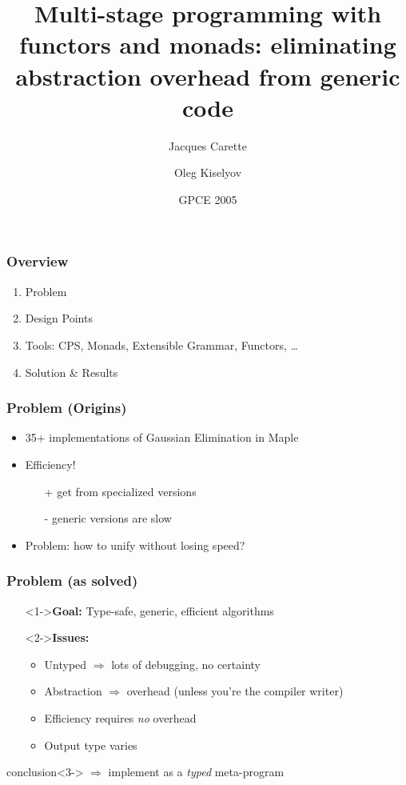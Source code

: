 \documentclass{beamer}
\title{Multi-stage programming with functors and monads:
eliminating abstraction overhead from generic code}
\author{Jacques Carette\inst{1} \and
Oleg Kiselyov\inst{2}}
\institute{\inst{1}McMaster University \inst{2} FNMOC}
\date{GPCE 2005}
\begin{document}
\divide{}
\divide{}
\divide{}
\divide{}

\newcommand{\seq}[1]{{\langle #1 \rangle}}
\newcommand{\set}[1]{{\{ #1 \}}}
\newcommand{\tuple}[1]{{( #1 )}}
\newcommand{\mname}[1]{\mbox{\sf #1}}
\newcommand{\Nat}{\mathbb N}

\begin{frame}
\titlepage
\end{frame}

\begin{frame}
\frametitle{Overview}
\begin{enumerate}
    \item Problem
    \item Design Points
    \item Tools: CPS, Monads, Extensible Grammar, Functors, \dots
    \item Solution \& Results
\end{enumerate}
\end{frame}

\begin{frame}
\frametitle{Problem (Origins)}
    \begin{itemize}
        \item<1-> 35+ implementations of Gaussian Elimination in Maple
        \item<2-> Efficiency!
            \begin{itemize}
                \item[+] get from specialized versions 
                \item[-] generic versions are slow
            \end{itemize}
        \item<3-> Problem: how to unify without losing speed?
    \end{itemize}
\end{frame}

\begin{frame}
    \frametitle{Problem (as solved)}
    \begin{itemize}
        \item[]<1->\textbf{Goal:} Type-safe, generic, efficient algorithms
        \item[]<2->\textbf{Issues:}
    \begin{itemize}
        \item Untyped $\Rightarrow$ lots of debugging, no certainty
        \item Abstraction $\Rightarrow$ overhead 
            (unless you're the compiler writer)
        \item Efficiency requires \emph{no} overhead
        \item Output type varies
    \end{itemize}
    \end{itemize}
    \begin{block}{conclusion}<3->
    $\Longrightarrow$ implement as a \emph{typed} meta-program
\end{block}
\end{frame}
\end{document}

